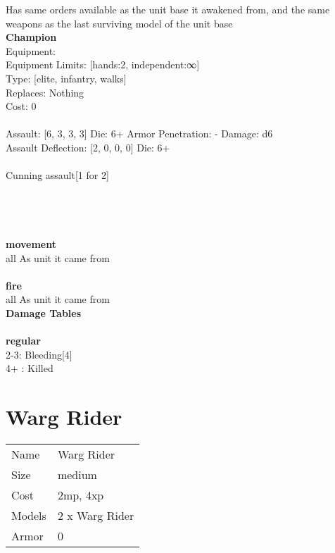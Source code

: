 \noindent Has same orders available as the unit base it awakened from, and the same weapons as the last surviving model of the unit base\\ 


{\bf Champion } \\
Equipment:  \\
Equipment Limits: [hands:2, independent:∞] \\
Type: [elite, infantry, walks] \\
Replaces: Nothing \\
Cost: 0\\
\ \\
Assault: [6, 3, 3, 3] Die: 6+ Armor Penetration: - Damage: d6 \\
Assault Deflection: [2, 0, 0, 0] Die: 6+\\
\\ 
Cunning assault[1 for 2]\\ 
 
\ \\

\ \\
 
\ \\



\ \\ {\bf movement } \\
all As unit it came from \\
\ \\ {\bf fire } \\
all As unit it came from \\


{\bf Damage Tables} \\
\ \\ {\bf regular } \\
2-3: Bleeding[4] \\
4+ : Killed \\










\pagebreak\pagebreak

\section{ Warg Rider }

\begin{tabular}{ll}
  Name & Warg Rider \\
  Size & medium\\
  Cost & 2mp, 4xp\\
  Models & 2 x Warg Rider\\
  Armor & 0\\
\end{tabular}

